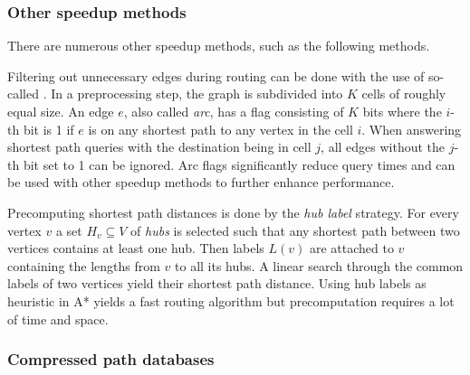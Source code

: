 		\subsubsection{Other speedup methods}
		\label{subsubsec:other-speedup-methods}
		
			There are numerous other speedup methods, such as the following methods.
			
			Filtering out unnecessary edges during routing can be done with the use of so-called \cite{bast-transportation-networks}.
			In a preprocessing step, the graph is subdivided into $K$ cells of roughly equal size.
			An edge $e$, also called \emph{arc}, has a flag consisting of $K$ bits where the $i$-th bit is 1 if $e$ is on any shortest path to any vertex in the cell $i$.
			When answering shortest path queries with the destination being in cell $j$, all edges without the $j$-th bit set to 1 can be ignored.
			Arc flags significantly reduce query times and can be used with other speedup methods to further enhance performance.
			
			Precomputing shortest path distances is done by the \emph{hub label} strategy\cite{bast-transportation-networks}.
			For every vertex $v$ a set $H_v \subseteq V$ of \emph{hubs} is selected such that any shortest path between two vertices contains at least one hub.
			Then labels $L(v)$ are attached to $v$ containing the lengths from $v$ to all its hubs.
			A linear search through the common labels of two vertices yield their shortest path distance.
			Using hub labels as heuristic in A* yields a fast routing algorithm but precomputation requires a lot of time and space.
		
		\subsubsection{Compressed path databases}
		\label{subsubsec:cpd}
		
